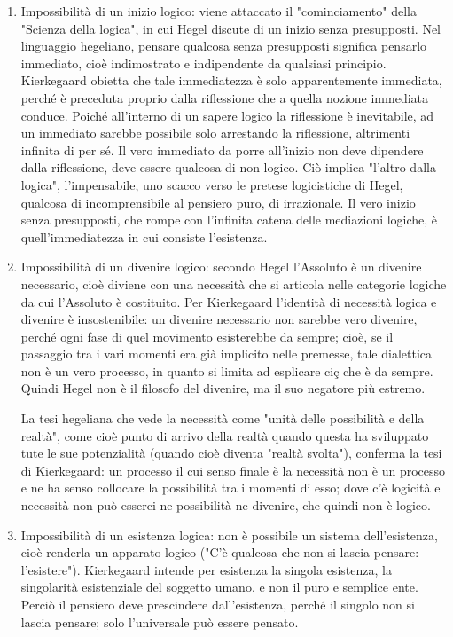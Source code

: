 \begin{enumerate}
	
	\item Impossibilità di un inizio logico: viene attaccato il "cominciamento" della "Scienza della logica", in cui Hegel discute di un inizio senza presupposti. Nel linguaggio hegeliano, pensare qualcosa senza presupposti significa pensarlo immediato, cioè indimostrato e indipendente da qualsiasi principio. Kierkegaard obietta che tale immediatezza è solo apparentemente immediata, perché è preceduta  proprio dalla riflessione che a quella nozione immediata conduce. Poiché all'interno di un sapere logico la riflessione è inevitabile, ad un immediato sarebbe possibile solo arrestando la riflessione, altrimenti infinita di per sé. Il vero immediato da porre all'inizio non deve dipendere dalla riflessione, deve essere qualcosa di non logico. Ciò implica "l'altro dalla logica", l'impensabile, uno scacco verso le pretese logicistiche di Hegel, qualcosa di incomprensibile al pensiero puro, di irrazionale. Il vero inizio senza presupposti, che rompe con l'infinita catena delle mediazioni logiche, è quell'immediatezza in cui consiste l'esistenza.

	\item Impossibilità di un divenire logico: secondo Hegel l'Assoluto è un divenire necessario, cioè diviene con una necessità che si articola nelle categorie logiche da cui l'Assoluto è costituito. Per Kierkegaard l'identità di necessità logica e divenire è insostenibile: un divenire necessario non sarebbe vero divenire, perché ogni fase di quel movimento esisterebbe da sempre; cioè, se il passaggio tra i vari momenti era già implicito nelle premesse, tale dialettica non è un vero processo, in quanto si limita ad esplicare ciç che è da sempre. Quindi Hegel non è il filosofo del divenire, ma il suo negatore più estremo. 
	
	La tesi hegeliana che vede la necessità come "unità delle possibilità e della realtà", come cioè punto di arrivo della realtà quando questa ha sviluppato tute le sue potenzialità (quando cioè diventa "realtà svolta"), conferma la tesi di Kierkegaard: un processo il cui senso finale è la necessità non è un processo e ne ha senso collocare la possibilità tra i momenti di esso; dove c'è logicità e necessità non può esserci ne possibilità ne divenire, che quindi non è logico.
	
	\item Impossibilità di un esistenza logica: non è possibile un sistema dell'esistenza, cioè renderla un apparato logico ("C'è qualcosa che non si lascia pensare: l'esistere"). Kierkegaard intende per esistenza la singola esistenza, la singolarità esistenziale del soggetto umano, e non il puro e semplice ente. Perciò il pensiero deve prescindere dall'esistenza, perché il singolo non si lascia pensare; solo l'universale può essere pensato.
	
\end{enumerate}

